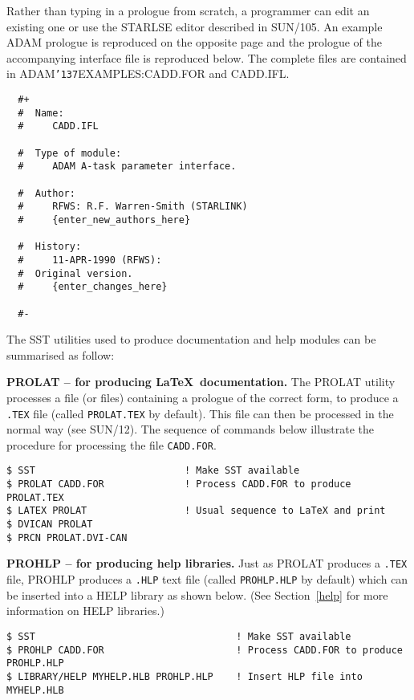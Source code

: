 \documentclass[twoside,11pt]{article}
\renewcommand{\_}{{\tt\char'137}}
\newcommand{\xref}[3]{#1}
\begin{document}
Rather than typing in a prologue from scratch, a programmer can edit an 
existing one or use the STARLSE editor described in \xref{SUN/105}{sun105}{}.
An example ADAM prologue is reproduced on the opposite page and the
prologue of the accompanying interface file is reproduced below.
The complete files are contained in ADAM\_EXAMPLES:CADD.FOR and 
{  CADD.IFL}.
\begin{verbatim}
  #+
  #  Name:
  #     CADD.IFL
  
  #  Type of module:
  #     ADAM A-task parameter interface.
  
  #  Author:
  #     RFWS: R.F. Warren-Smith (STARLINK)
  #     {enter_new_authors_here}
  
  #  History:
  #     11-APR-1990 (RFWS):
  #	 Original version.
  #     {enter_changes_here}
  
  #-
\end{verbatim}
The SST utilities used to produce documentation and help modules 
can be summarised as follow:
\begin{description}
\item{\bf PROLAT -- for producing \LaTeX\ documentation.}
The PROLAT utility processes a file (or files) containing a prologue 
of the correct form,
to produce a {\tt .TEX} file (called {\tt PROLAT.TEX} by default).
This file can then be processed in the normal way (see \xref{SUN/12}{sun12}{}).
The sequence of commands  below illustrate the procedure for processing 
the file {\tt CADD.FOR}.
\begin{verbatim}
$ SST                          ! Make SST available
$ PROLAT CADD.FOR              ! Process CADD.FOR to produce PROLAT.TEX
$ LATEX PROLAT                 ! Usual sequence to LaTeX and print
$ DVICAN PROLAT                
$ PRCN PROLAT.DVI-CAN          
\end{verbatim}
\item{\bf PROHLP -- for producing help libraries.} Just as PROLAT produces a 
{\tt .TEX} file, PROHLP produces a {\tt .HLP} text file (called 
{\tt PROHLP.HLP} by default) which can be inserted 
into a HELP library as shown below. (See Section~\ref{help} for more 
information on HELP libraries.)
\begin{verbatim}
$ SST                                   ! Make SST available
$ PROHLP CADD.FOR                       ! Process CADD.FOR to produce PROHLP.HLP
$ LIBRARY/HELP MYHELP.HLB PROHLP.HLP    ! Insert HLP file into MYHELP.HLB
\end{verbatim}
\end{description}
\end{document}

